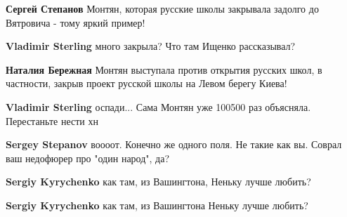 \begin{itemize}
\begin{itemize}
\textbf{Сергей Степанов} Монтян, которая русские школы закрывала задолго до Вятровича - тому яркий пример!

 
\textbf{Vladimir Sterling} много закрыла? Что там Ищенко рассказывал?

 
\textbf{Наталия Бережная} Монтян выступала против открытия русских школ, в частности, закрыв проект русской школы на Левом берегу Киева!

 
\textbf{Vladimir Sterling} оспади... Сама Монтян уже 100500 раз объясняла. Перестаньте нести хн

 
\textbf{Sergey Stepanov} воооот. Конечно же одного поля. Не такие как вы. Соврал ваш недофюрер про "один народ", да?

 
\textbf{Sergiy Kyrychenko} как там, из Вашингтона, Неньку лучше любить?

 
\textbf{Sergiy Kyrychenko} как там, из Вашингтона Неньку лучше любить?


\end{itemize}
\end{itemize}
